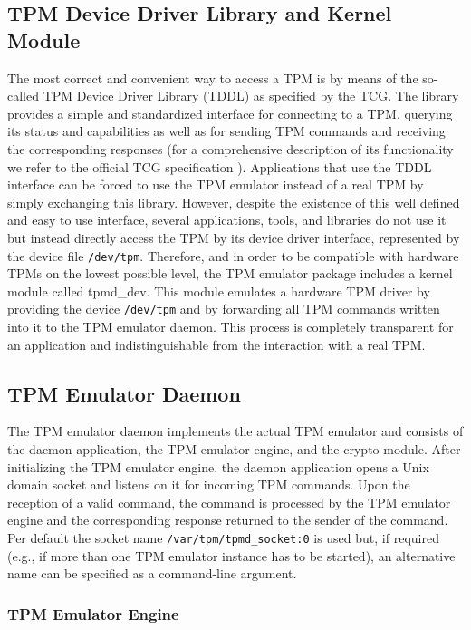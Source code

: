 \documentclass[runningheads]{llncs}
\newcommand{\file}[1]{\small\texttt{#1}\normalsize}
\begin{document}
\subsection{TPM Device Driver Library and Kernel Module}
The most correct and convenient way to access a TPM is by means of the so-called TPM Device Driver
Library (TDDL) as specified by the TCG. The library provides a simple and standardized interface for
connecting to a TPM, querying its status and capabilities as well as for sending TPM commands and
receiving the corresponding responses (for a comprehensive description of its functionality we
refer to the official TCG specification \cite{TSS}). Applications that use the TDDL interface can
be forced to use the TPM emulator instead of a real TPM by simply exchanging this library. However,
despite the existence of this well defined and easy to use interface, several applications, tools,
and libraries do not use it but instead directly access the TPM by its device driver interface,
represented by the device file \file{/dev/tpm}. Therefore, and in order to be compatible with
hardware TPMs on the lowest possible level, the TPM emulator package includes a kernel module called
tpmd\_dev. This module emulates a hardware TPM driver by providing the device \file{/dev/tpm} and
by forwarding all TPM commands written into it to the TPM emulator daemon. This process is
completely transparent for an application and indistinguishable from the interaction with a real TPM.

\subsection{TPM Emulator Daemon}
The TPM emulator daemon implements the actual TPM emulator and consists of the daemon application,
the TPM emulator engine, and the crypto module. After initializing the TPM emulator engine, the
daemon application opens a Unix domain socket and listens on it for incoming TPM commands. Upon
the reception of a valid command, the command is processed by the TPM emulator engine and the
corresponding response returned to the sender of the  command. Per default the socket name
\file{/var/tpm/tpmd\_socket:0} is used but, if required (e.g., if more than one TPM emulator
instance has to be started), an alternative name can be specified as a command-line argument.

\subsubsection{TPM Emulator Engine}
\end{document}

